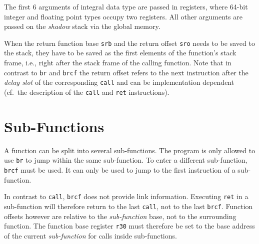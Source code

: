 The first $6$ arguments of integral data type are passed in registers, where
64-bit integer and floating point types occupy two registers. All other
arguments are passed on the \emph{shadow} stack via the global memory.



When the return function base \texttt{srb} and the return offset \texttt{sro}
needs to be saved to the stack, they have to be saved as the first elements of
the function's stack frame, i.e., right after the stack frame of the calling
function.
%
Note that in contrast to \texttt{br} and \texttt{brcf} the return offset refers
to the next instruction after the \emph{delay slot} of the corresponding
\texttt{call} and can be implementation dependent (cf.\ the description of the
\texttt{call} and \texttt{ret} instructions).

\section{Sub-Functions}
A function can be split into several sub-functions. The program is only allowed to use
\texttt{br} to jump within the same sub-function. To enter a different sub-function,
\texttt{brcf} must be used. It can only be used to jump to the first instruction of a
sub-function.

In contrast to \texttt{call}, \texttt{brcf} does not provide link information.
Executing \texttt{ret} in a sub-function will therefore return to the last \texttt{call}, not to the last \texttt{brcf}.
Function offsets however are relative to the \emph{sub-function} base, not to the surrounding function.
The function base register \texttt{r30} must therefore be set to the base address
of the current \emph{sub-function} for calls inside sub-functions.

